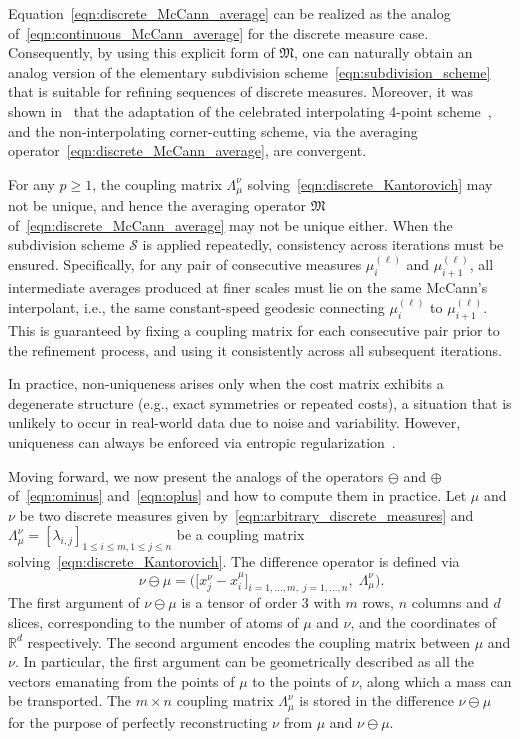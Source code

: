 \documentclass[12pt]{amsart}
\begin{document}
Equation~\eqref{eqn:discrete_McCann_average} can be realized as the analog of~\eqref{eqn:continuous_McCann_average} for the discrete measure case. Consequently, by using this explicit form of $\mathfrak{M}$, one can naturally obtain an analog version of the elementary subdivision scheme~\eqref{eqn:subdivision_scheme} that is suitable for refining sequences of discrete measures. Moreover, it was shown in~\cite{baccou2024subdivision} that the adaptation of the celebrated interpolating 4-point scheme~\cite{dyn1992subdivision}, and the non-interpolating corner-cutting scheme, via the averaging operator~\eqref{eqn:discrete_McCann_average}, are convergent.

For any $p\geq 1$, the coupling matrix $\Lambda_\mu^\nu$ solving~\eqref{eqn:discrete_Kantorovich} may not be unique, and hence the averaging operator $\mathfrak{M}$ of~\eqref{eqn:discrete_McCann_average} may not be unique either. When the subdivision scheme $\mathcal{S}$ is applied repeatedly, consistency across iterations must be ensured. Specifically, for any pair of consecutive measures $\mu_i^{(\ell)}$ and $\mu_{i+1}^{(\ell)}$, all intermediate averages produced at finer scales must lie on the same McCann's interpolant, i.e., the same constant-speed geodesic connecting $\mu_i^{(\ell)}$ to $\mu_{i+1}^{(\ell)}$. This is guaranteed by fixing a coupling matrix for each consecutive pair prior to the refinement process, and using it consistently across all subsequent iterations.

In practice, non-uniqueness arises only when the cost matrix exhibits a degenerate structure (e.g., exact symmetries or repeated costs), a situation that is unlikely to occur in real-world data due to noise and variability. However, uniqueness can always be enforced via entropic regularization~\cite{peyre2019computational}.

Moving forward, we now present the analogs of the operators $\ominus$ and $\oplus$ of~\eqref{eqn:ominus} and~\eqref{eqn:oplus} and how to compute them in practice. Let $\mu$ and $\nu$ be two discrete measures given by~\eqref{eqn:arbitrary_discrete_measures} and $\Lambda_{\mu}^{\nu}=[\lambda_{i,j}]_{1\leq i\leq m, 1\leq j\leq n}$ be a coupling matrix solving~\eqref{eqn:discrete_Kantorovich}. The difference operator is defined via
\begin{equation}~\label{eqn:discrete_ominus}
    \nu\ominus\mu=\bigg(\big[x^\nu_j-x^\mu_i\big]_{i=1,\dots,m, \;j=1,\dots,n}, \;\Lambda_\mu^\nu\bigg).
\end{equation}
The first argument of $\nu\ominus\mu$ is a tensor of order $3$ with $m$ rows, $n$ columns and $d$ slices, corresponding to the number of atoms of $\mu$ and $\nu$, and the coordinates of $\mathbb{R}^d$ respectively. The second argument encodes the coupling matrix between $\mu$ and $\nu$. In particular, the first argument can be geometrically described as all the vectors emanating from the points of $\mu$ to the points of $\nu$, along which a mass can be transported. The $m\times n$ coupling matrix $\Lambda_\mu^\nu$ is stored in the difference $\nu\ominus\mu$ for the purpose of perfectly reconstructing $\nu$ from $\mu$ and $\nu\ominus\mu$.
\end{document}
